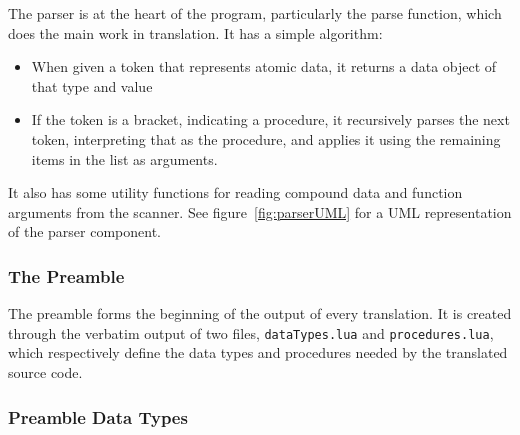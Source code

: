 The parser is at the heart of the program, particularly the parse function,
which does the main work in translation. It has a simple algorithm:
\begin{itemize}
\item When given a token that represents atomic data, it returns a data object of that type and value
\item If the token is a bracket, indicating a procedure, it recursively parses
the next token, interpreting that as the procedure, and applies it using the
remaining items in the list as arguments.
\end{itemize}
It also has some utility functions for reading compound data and function
arguments from the scanner. See figure~\ref{fig:parserUML} for a UML representation of the parser component.

\subsubsection{The Preamble}

The preamble forms the beginning of the output of every translation. It is
created through the verbatim output of two files, \texttt{dataTypes.lua} and
\texttt{procedures.lua}, which respectively define the data types and procedures
needed by the translated source code.

\subsubsection{Preamble Data Types}

